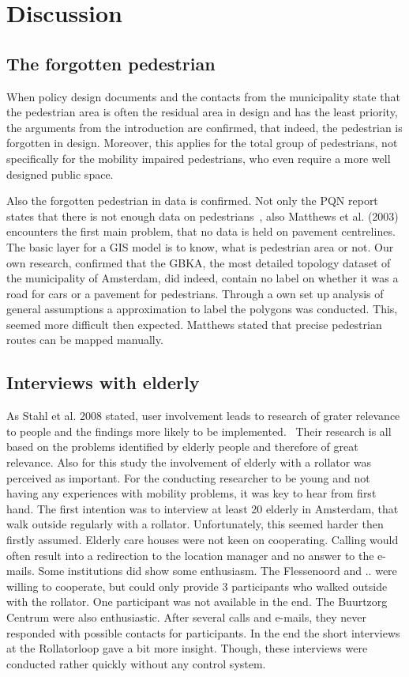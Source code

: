 \section{Discussion} %
 

\subsection{The forgotten pedestrian}
When policy design documents and the contacts from the municipality state that the pedestrian area is often the residual area in design and has the least priority, the arguments from the introduction are confirmed, that indeed, the pedestrian is forgotten in design. Moreover, this applies for the total group of pedestrians, not specifically for the mobility impaired pedestrians, who even require a more well designed public space. 

Also the forgotten pedestrian in data is confirmed. Not only the PQN report states that there is not enough data on pedestrians~\cite{Sauter2010}, also Matthews et al. (2003)~\cite{Matthews2003} encounters the first main problem, that no data is held on pavement centrelines. The basic layer for a GIS model is to know, what is pedestrian area or not. Our own research, confirmed that the GBKA, the most detailed topology dataset of the municipality of Amsterdam, did indeed, contain no label on whether it was a road for cars or a pavement for pedestrians. Through a own set up analysis of general assumptions a approximation to label the polygons was conducted. This, seemed more difficult then expected. Matthews stated that precise pedestrian routes can be mapped manually.~\cite{Matthews2003}


\subsection{Interviews with elderly}

As Stahl et al. 2008 stated, user involvement leads to research of grater relevance to people and the findings more likely to be implemented.~\cite{Stahl2008} Their research is all based on the problems identified by elderly people and therefore of great relevance. Also for this study the involvement of elderly with a rollator was perceived as important. For the conducting researcher to be young and not having any experiences with mobility problems, it was key to hear from first hand. The first intention was to interview at least 20 elderly in Amsterdam, that walk outside regularly with a rollator. Unfortunately, this seemed harder then firstly assumed. Elderly care houses were not keen on cooperating. Calling would often result into a redirection to the location manager and no answer to the e-mails. Some institutions did show some enthusiasm. The Flessenoord and .. were willing to cooperate, but could only provide 3 participants who walked outside with the rollator. One participant was not available in the end. The Buurtzorg Centrum were also enthusiastic. After several calls and e-mails, they never responded with possible contacts for participants. In the end the short interviews at the Rollatorloop gave a bit more insight. Though, these interviews were conducted rather quickly without any control system.

